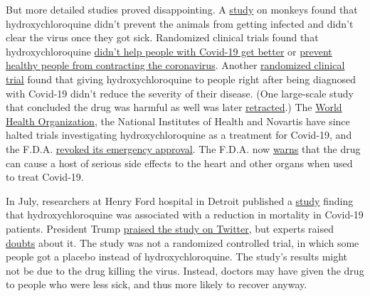 But more detailed studies proved disappointing. A
\href{https://www.nature.com/articles/s41586-020-2558-4}{study} on
monkeys found that hydroxychloroquine didn't prevent the animals from
getting infected and didn't clear the virus once they got sick.
Randomized clinical trials found that hydroxychloroquine
\href{https://www.recoverytrial.net/news/statement-from-the-chief-investigators-of-the-randomised-evaluation-of-covid-19-therapy-recovery-trial-on-hydroxychloroquine-5-june-2020-no-clinical-benefit-from-use-of-hydroxychloroquine-in-hospitalised-patients-with-covid-19}{didn't
help people with Covid-19 get better} or
\href{https://www.nytimes3xbfgragh.onion/2020/06/03/health/hydroxychloroquine-coronavirus-trump.html}{prevent
healthy people from contracting the coronavirus}. Another
\href{https://www.acpjournals.org/doi/10.7326/M20-4207}{randomized
clinical trial} found that giving hydroxychloroquine to people right
after being diagnosed with Covid-19 didn't reduce the severity of their
disease. (One large-scale study that concluded the drug was harmful as
well was later
\href{https://www.nytimes3xbfgragh.onion/2020/06/04/health/coronavirus-hydroxychloroquine.html?searchResultPosition=1}{retracted}.)
The
\href{https://www.who.int/news-room/detail/04-07-2020-who-discontinues-hydroxychloroquine-and-lopinavir-ritonavir-treatment-arms-for-covid-19}{World
Health Organization}, the National Institutes of Health and Novartis
have since halted trials investigating hydroxychloroquine as a treatment
for Covid-19, and the F.D.A.
\href{https://www.nytimes3xbfgragh.onion/2020/06/15/health/fda-hydroxychloroquine-malaria.html}{revoked
its emergency approval}. The F.D.A. now
\href{https://www.fda.gov/drugs/drug-safety-and-availability/fda-cautions-against-use-hydroxychloroquine-or-chloroquine-covid-19-outside-hospital-setting-or}{warns}
that the drug can cause a host of serious side effects to the heart and
other organs when used to treat Covid-19.

In July, researchers at Henry Ford hospital in Detroit published a
\href{https://www.statnews.com/2020/07/08/a-flawed-covid-19-study-gets-the-white-houses-attention-and-the-fda-may-pay-the-price/}{study}
finding that hydroxychloroquine was associated with a reduction in
mortality in Covid-19 patients. President Trump
\href{https://twitter.com/realDonaldTrump/status/1280328830218051584}{praised
the study on Twitter}, but experts raised
\href{https://www.sciencedirect.com/science/article/pii/S1201971220305300?dgcid=rss_sd_all}{doubts}
about it. The study was not a randomized controlled trial, in which some
people got a placebo instead of hydroxychloroquine. The study's results
might not be due to the drug killing the virus. Instead, doctors may
have given the drug to people who were less sick, and thus more likely
to recover anyway.

